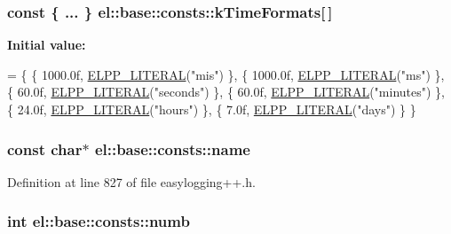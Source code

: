 \subsubsection[{k\+Time\+Formats}]{\setlength{\rightskip}{0pt plus 5cm}const \{ ... \}   el\+::base\+::consts\+::k\+Time\+Formats\mbox{[}$\,$\mbox{]}}\label{namespaceel_1_1base_1_1consts_aebf5600a219b9313965789b468416edd}
{\bfseries Initial value\+:}
\begin{DoxyCode}
= \{
       \{ 1000.0f, \hyperlink{easylogging_09_09_8h_a8b95c408a099e5d09ca9a9811513a084}{ELPP\_LITERAL}(\textcolor{stringliteral}{"mis"}) \},
       \{ 1000.0f, \hyperlink{easylogging_09_09_8h_a8b95c408a099e5d09ca9a9811513a084}{ELPP\_LITERAL}(\textcolor{stringliteral}{"ms"}) \},
       \{ 60.0f, \hyperlink{easylogging_09_09_8h_a8b95c408a099e5d09ca9a9811513a084}{ELPP\_LITERAL}(\textcolor{stringliteral}{"seconds"}) \},
       \{ 60.0f, \hyperlink{easylogging_09_09_8h_a8b95c408a099e5d09ca9a9811513a084}{ELPP\_LITERAL}(\textcolor{stringliteral}{"minutes"}) \},
       \{ 24.0f, \hyperlink{easylogging_09_09_8h_a8b95c408a099e5d09ca9a9811513a084}{ELPP\_LITERAL}(\textcolor{stringliteral}{"hours"}) \},
       \{ 7.0f, \hyperlink{easylogging_09_09_8h_a8b95c408a099e5d09ca9a9811513a084}{ELPP\_LITERAL}(\textcolor{stringliteral}{"days"}) \}
    \}
\end{DoxyCode}
\hypertarget{namespaceel_1_1base_1_1consts_a190f5acd3504cafb1adeae14e95cae5f}{}
\subsubsection[{name}]{\setlength{\rightskip}{0pt plus 5cm}const char$\ast$ el\+::base\+::consts\+::name}\label{namespaceel_1_1base_1_1consts_a190f5acd3504cafb1adeae14e95cae5f}


Definition at line 827 of file easylogging++.\+h.

\hypertarget{namespaceel_1_1base_1_1consts_ad500da448be26a12d4ca42afc29a1316}{}
\subsubsection[{numb}]{\setlength{\rightskip}{0pt plus 5cm}int el\+::base\+::consts\+::numb}\label{namespaceel_1_1base_1_1consts_ad500da448be26a12d4ca42afc29a1316}


